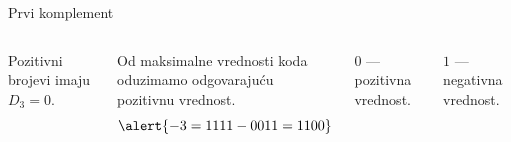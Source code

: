 \begin{frame}[label=04-s031]{Prvi komplement}
\begin{columns}[c,onlytextwidth]
\centering
{\fontsize{9}{10}\selectfont\renewcommand{\arraystretch}{.82}\setlength{\tabcolsep}{4pt}\par}
Pozitivni brojevi imaju $D_3=0$.\par\vspace{3mm}
Od maksimalne vrednosti koda oduzimamo odgovarajuću pozitivnu vrednost.
\[\alert{-3=1111-0011=1100}\]
\par\vspace{3mm}
$0$ — pozitivna vrednost.\par
$1$ — negativna vrednost.
\end{columns}
\end{frame}
